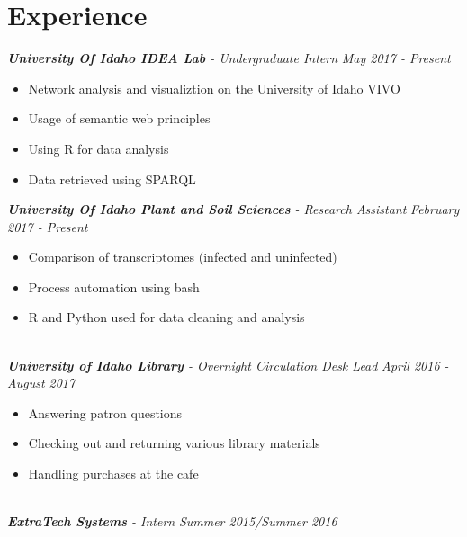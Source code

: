 \documentclass[10pt]{article}
\begin{document}
\section*{Experience}
  \vspace{2mm}
  \textit{\textbf{University Of Idaho IDEA Lab} - Undergraduate Intern} \hfill \textit{May 2017 - Present}
    \begin{adjustwidth}{5mm}{}
  	  \begin{itemize}[noitemsep,nolistsep]
        \item Network analysis and visualiztion on the University of Idaho VIVO
        \item Usage of semantic web principles
        \item Using R for data analysis
        \item Data retrieved using SPARQL
  	  \end{itemize}
  	\end{adjustwidth}
  \vspace{2mm}
  \textit{\textbf{University Of Idaho Plant and Soil Sciences} - Research Assistant} \hfill \textit{February 2017 - Present}
    \begin{adjustwidth}{5mm}{}
      \begin{itemize}[noitemsep,nolistsep]
        \item Comparison of transcriptomes (infected and uninfected)
        \item Process automation using bash
        \item R and Python used for data cleaning and analysis
  	  \end{itemize}
    \end{adjustwidth}
  \noindent
  \\ \textit{\textbf{University of Idaho Library} - Overnight Circulation Desk Lead} \hfill \textit{April 2016 - August 2017}   
    \begin{adjustwidth}{5mm}{}
      \begin{itemize}[noitemsep,nolistsep]
        \item Answering patron questions
        \item Checking out and returning various library materials
        \item Handling purchases at the cafe
  	  \end{itemize}
    \end{adjustwidth}
  \noindent
  \\ \textit{\textbf{ExtraTech Systems} - Intern} \hfill \textit{Summer 2015/Summer 2016}
\end{document}
